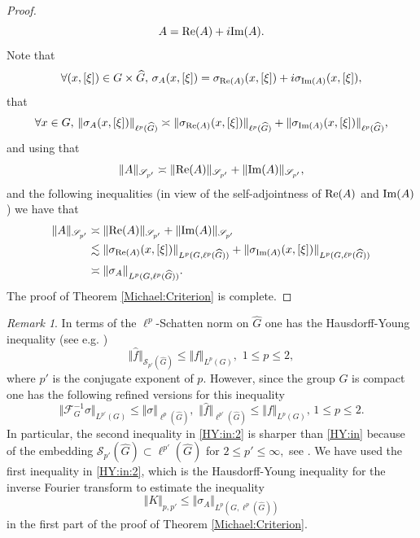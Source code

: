 \documentclass[12pt, reqno]{amsart}
\theoremstyle{definition}
\theoremstyle{remark}
\newtheorem{remark}[theorem]{Remark}
\numberwithin{equation}{section}
\begin{document}
\begin{proof}
\begin{equation}
    A=\textnormal{Re}(A)+i\textnormal{Im}(A).
\end{equation}Note that
\begin{equation}
  \forall(x,[\xi])\in G\times \widehat{G},\,  \sigma_A(x,[\xi])=\sigma_{\textnormal{Re}(A)}(x,[\xi])+i\sigma_{\textnormal{Im}(A)}(x,[\xi]),
\end{equation}
that 
\begin{equation}
\forall  x\in G,\,  \|\sigma_A(x,[\xi])\|_{ \ell^{p}(\widehat{G}) }\asymp \|\sigma_{\textnormal{Re}(A)}(x,[\xi])\|_{ \ell^{p}(\widehat{G}) }+\|\sigma_{\textnormal{Im}(A)}(x,[\xi])\|_{ \ell^{p}(\widehat{G}) },
\end{equation} and using that
\begin{equation}
    \| A\|_{\mathscr{S}_{p'}}\asymp  \| \textnormal{Re}(A)\|_{\mathscr{S}_{p'}}+ \| \textnormal{Im}(A)\|_{\mathscr{S}_{p'}},
\end{equation}and the following inequalities (in view of the self-adjointness of $\textnormal{Re}(A)$ and $\textnormal{Im}(A)$) we have that 
\begin{align*}
  \| A\|_{\mathscr{S}_{p'}} &\asymp  \| \textnormal{Re}(A)\|_{\mathscr{S}_{p'}}+ \| \textnormal{Im}(A)\|_{\mathscr{S}_{p'}}\\
  &\lesssim \|\sigma_{\textnormal{Re}(A)}(x,[\xi])\|_{L^p(G,\ell^{p}(\widehat{G})) }+\|\sigma_{\textnormal{Im}(A)}(x,[\xi])\|_{L^p(G,\ell^{p}(\widehat{G}))}\\
 & \asymp   \| \sigma_A\|_{L^p(G,\ell^{p}(\widehat{G})) }.
\end{align*}
The proof of Theorem \ref{Michael:Criterion} is complete.
\end{proof}
\begin{remark} In terms of the $\ell^p$-Schatten norm on $\widehat{G}$ one has the Hausdorff-Young inequality (see e.g. \cite[Page 67]{FischerRuzhanskyBook}) 
\begin{equation}\label{HY:in}
\Vert \widehat{f}\Vert_{\mathscr{S}_{p'}(\widehat{G})}\leq \Vert f\Vert_{L^p(G)}, \,\,1\leq  p\leq 2,    
\end{equation}
where $p'$ is the conjugate exponent of $p.$ However, since the group $G$ is compact one has the following refined versions for this inequality
\begin{equation}\label{HY:in:2}
    \Vert\mathscr{F}_G^{-1}\sigma\Vert_{L^{p'}(G)}\leq \Vert \sigma\Vert_{\ell^{p}(\widehat{G})},\,\,\Vert\widehat{f}\Vert_{\ell^{p'}(\widehat{G})}\leq \Vert f\Vert_{L^p(G)},\,1\leq p\leq 2.
\end{equation}In particular, the second inequality in \eqref{HY:in:2} is sharper than  \eqref{HY:in} because of the embedding $\mathscr{S}_{p'}(\widehat{G})\subset \ell^{p'}(\widehat{G})$ for $2\leq p'\leq \infty,$ see \cite[Page 70]{FischerRuzhanskyBook}. We have used the first inequality in \eqref{HY:in:2}, which is the Hausdorff-Young inequality for the inverse Fourier transform to estimate the inequality $$  \Vert K\Vert_{p,p'} \leq \Vert\sigma_A\Vert_{L^p(G,\ell^{p}(\widehat{G}))}$$ in the first part of the proof of Theorem \ref{Michael:Criterion}.
\end{remark}
\end{document}
